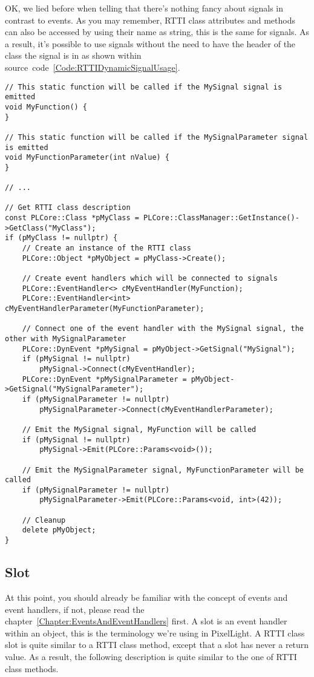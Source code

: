 OK, we lied before when telling that there's nothing fancy about signals in contrast to events. As you may remember, RTTI class attributes and methods can also be accessed by using their name as string, this is the same for signals. As a result, it's possible to use signals without the need to have the header of the class the signal is in as shown within source~code~\ref{Code:RTTIDynamicSignalUsage}.
\begin{lstlisting}[label=Code:RTTIDynamicSignalUsage,caption={Using signals of a RTTI class dynamically}]
// This static function will be called if the MySignal signal is emitted
void MyFunction() {
}

// This static function will be called if the MySignalParameter signal is emitted
void MyFunctionParameter(int nValue) {
}

// ...

// Get RTTI class description
const PLCore::Class *pMyClass = PLCore::ClassManager::GetInstance()->GetClass("MyClass");
if (pMyClass != nullptr) {
	// Create an instance of the RTTI class
	PLCore::Object *pMyObject = pMyClass->Create();

	// Create event handlers which will be connected to signals
	PLCore::EventHandler<> cMyEventHandler(MyFunction);
	PLCore::EventHandler<int> cMyEventHandlerParameter(MyFunctionParameter);

	// Connect one of the event handler with the MySignal signal, the other with MySignalParameter
	PLCore::DynEvent *pMySignal = pMyObject->GetSignal("MySignal");
	if (pMySignal != nullptr)
		pMySignal->Connect(cMyEventHandler);
	PLCore::DynEvent *pMySignalParameter = pMyObject->GetSignal("MySignalParameter");
	if (pMySignalParameter != nullptr)
		pMySignalParameter->Connect(cMyEventHandlerParameter);

	// Emit the MySignal signal, MyFunction will be called
	if (pMySignal != nullptr)
		pMySignal->Emit(PLCore::Params<void>());

	// Emit the MySignalParameter signal, MyFunctionParameter will be called
	if (pMySignalParameter != nullptr)
		pMySignalParameter->Emit(PLCore::Params<void, int>(42));

	// Cleanup
	delete pMyObject;
}
\end{lstlisting}



\subsection{Slot}
At this point, you should already be familiar with the concept of events and event handlers, if not, please read the chapter~\ref{Chapter:EventsAndEventHandlers} first. A slot is an event handler within an object, this is the terminology we're using in PixelLight. A RTTI class slot is quite similar to a RTTI class method, except that a slot has never a return value. As a result, the following description is quite similar to the one of RTTI class methods.

